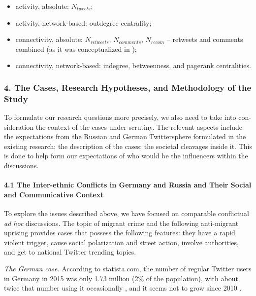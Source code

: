\begin{itemize}
	\item activity, absolute: \(N_{tweets}\);
	\item activity, network-based: outdegree centrality;
	\item connectivity, absolute: \(N_{retweets}\), \(N_{comments}\), \(N_{recom}\) -- retweets and comments combined (as it was conceptualized in \cite{Bruns2014});
	\item connectivity, network-based: indegree, betweenness, and pagerank centralities.
\end{itemize}

\subsubsection{4. The Cases, Research Hypotheses, and Methodology of the Study}

To formulate our research questions more precisely, we also need to take into con- sideration the context of the cases under scrutiny. The relevant aspects include the expectations from the Russian and German Twittersphere formulated in the existing research; the description of the cases; the societal cleavages inside it. This is done to help form our expectations of who would be the influencers within the discussions.

\paragraph{4.1 The Inter-ethnic Conflicts in Germany and Russia and Their Social and Communicative Context} 

To explore the issues described above, we have focused on comparable conflictual \textit{ad hoc} discussions. The topic of migrant crime and the following anti-migrant uprising provides cases that possess the following features: they have a rapid violent trigger, cause social polarization and street action, involve authorities, and get to national Twitter trending topics.

\textit{The German case.} According to statista.com, the number of regular Twitter users in Germany in 2015 was only 1.73 million (2\% of the population), with about twice that number using it occasionally \cite{Kissane}, and it seems not to grow since 2010 \cite{TumasjanSprengerSadner}.

